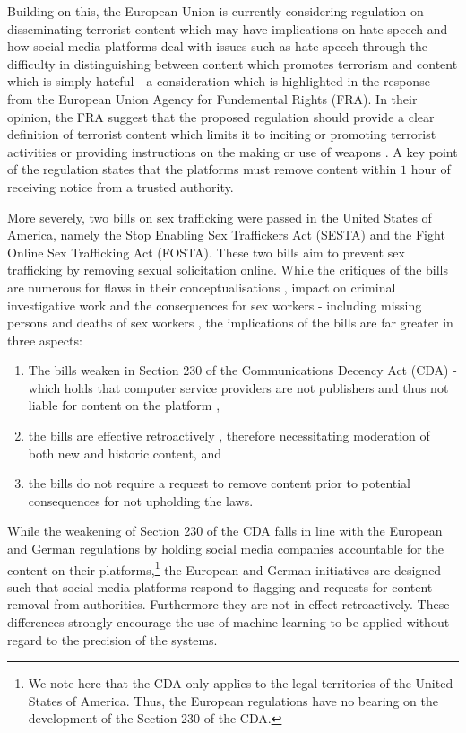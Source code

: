 Building on this, the European Union is currently considering regulation on disseminating terrorist content which may have implications on hate speech and how social media platforms deal with issues such as hate speech \citep{EUCommission:2018} through the difficulty in distinguishing between content which promotes terrorism and content which is simply hateful - a consideration which is highlighted in the response from the European Union Agency for Fundemental Rights (FRA). In their opinion, the FRA suggest that the proposed regulation should provide a clear definition of terrorist content which limits it to inciting or promoting terrorist activities or providing instructions on the making or use of weapons \citep{FRA:2019}. A key point of the regulation states that the platforms must remove content within $1$ hour of receiving notice from a trusted authority.\vspace{5mm}

More severely, two bills on sex trafficking were passed in the United States of America, namely the Stop Enabling Sex Traffickers Act (SESTA) and the Fight Online Sex Trafficking Act (FOSTA). These two bills aim to prevent sex trafficking by removing sexual solicitation online. While the critiques of the bills are numerous for flaws in their conceptualisations \citep{Romano:2018}, impact on criminal investigative work \citep{Q:2018} and the consequences for sex workers - including missing persons and deaths of sex workers \citep{Blue:2018,Simon:2018}, the implications of the bills are far greater in three aspects:

\begin{enumerate}
  \item{The bills weaken \citep{Romano:2018,Stryker:2018} in Section 230 of the Communications Decency Act (CDA) - which holds that computer service providers are not publishers and thus not liable for content on the platform \citep{EFF:230},}
  \item{the bills are effective retroactively \citep{Stryker:2018}, therefore necessitating moderation of both new and historic content, and}
  \item{the bills do not require a request to remove content prior to potential consequences for not upholding the laws.}
\end{enumerate}

While the weakening of Section 230 of the CDA falls in line with the European and German regulations by holding social media companies accountable for the content on their platforms,\footnote{We note here that the CDA only applies to the legal territories of the United States of America. Thus, the European regulations have no bearing on the development of the Section 230 of the CDA.} the European and German initiatives are designed such that social media platforms respond to flagging and requests for content removal from authorities. Furthermore they are not in effect retroactively. These differences strongly encourage the use of machine learning to be applied without regard to the precision of the systems.\vspace{5mm}



